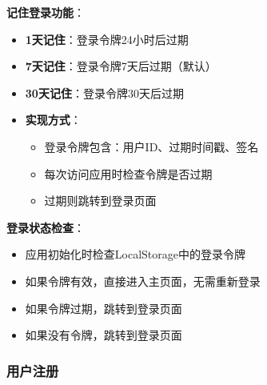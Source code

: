 \documentclass[12pt,a4paper]{article}
\begin{document}
\textbf{记住登录功能}：
\begin{itemize}
    \item \textbf{1天记住}：登录令牌24小时后过期
    \item \textbf{7天记住}：登录令牌7天后过期（默认）
    \item \textbf{30天记住}：登录令牌30天后过期
    \item \textbf{实现方式}：
        \begin{itemize}
            \item 登录令牌包含：用户ID、过期时间戳、签名
            \item 每次访问应用时检查令牌是否过期
            \item 过期则跳转到登录页面
        \end{itemize}
\end{itemize}

\textbf{登录状态检查}：
\begin{itemize}
    \item 应用初始化时检查LocalStorage中的登录令牌
    \item 如果令牌有效，直接进入主页面，无需重新登录
    \item 如果令牌过期，跳转到登录页面
    \item 如果没有令牌，跳转到登录页面
\end{itemize}

\subsubsection{用户注册}
\end{document}
